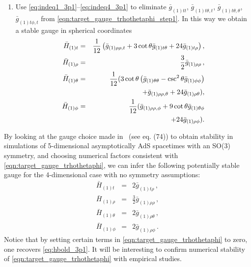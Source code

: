 \documentclass[aps,letterpaper,twocolumn,nofootinbib]{revtex4}
\numberwithin{equation}{section}
\begin{document}
\begin{enumerate}
\item Use \eqref{eq:indeq1_3p1}--\eqref{eq:indeq4_3p1} to eliminate $\bar{g}_{(1)tt}$, $\bar{g}_{(1)t\theta,t}$, $\bar{g}_{(1)t\theta,\theta}$, $\bar{g}_{(1)t\phi,t}$ from \eqref{eqn:target_gauge_trhothetaphi_step1}.
In this way we obtain a stable gauge in spherical coordinates
\begin{eqnarray}\label{eqn:target_gauge_trhothetaphi}
\bar{H}_{(1)t}&=&\frac{1}{12} \left(\bar{g}_{(1) \rho \rho ,t}+3 \cot \theta  \bar{g}_{(1) \text{$t$$\theta
   $}}+24 \bar{g}_{(1) \text{$t$$\rho $}}\right), \nonumber\\
\bar{H}_{(1)\rho}&=&\frac{3}{2} \bar{g}_{(1) \rho \rho }\,,\nonumber\\
\bar{H}_{(1)\theta}&=&\frac{1}{12} (3 \cot \theta  \left(\bar{g}_{(1)\theta\theta}-\csc ^2\theta \bar{g}_{(1) \phi \phi }\right)\nonumber \\
   &&\hspace{0.5cm}+\bar{g}_{(1) \rho \rho ,\theta }+24 \bar{g}_{(1) \rho \theta }),\nonumber\\
\bar{H}_{(1)\phi}&=&\frac{1}{12}(\bar{g}_{(1) \rho \rho ,\phi }+9 \cot \theta  \bar{g}_{(1)\theta \phi}\nonumber \\
   &&\hspace{0.5cm}+24 \bar{g}_{(1) \rho \phi }).
\end{eqnarray}
\end{enumerate}
By looking at the gauge choice made in~\cite{Bantilan:2012vu} (see eq. (74)) to obtain stability in simulations of 5-dimensional asymptotically AdS spacetimes with an SO(3) symmetry, and choosing numerical factors consistent with \eqref{eqn:target_gauge_trhothetaphi}, we can infer the following potentially stable gauge for the 4-dimensional case with no symmetry assumptions:
\begin{eqnarray}
\label{eq:hbold_3p1}
\bar{H}_{(1)t}&=&2 \bar{g}_{(1)\text{$t$$\rho $}}\,, \nonumber\\
\bar{H}_{(1)\rho}&=&\frac{3}{2} \bar{g}_{(1) \rho \rho }\,,\nonumber\\
\bar{H}_{(1)\theta}&=&2 \bar{g}_{(1) \rho \theta }\,,\nonumber\\
\bar{H}_{(1)\phi}&=&2 \bar{g}_{(1) \rho \phi }\,.
\end{eqnarray}
Notice that by setting certain terms in \eqref{eqn:target_gauge_trhothetaphi} to zero, one recovers \eqref{eq:hbold_3p1}.
It will be interesting to confirm numerical stability of \eqref{eqn:target_gauge_trhothetaphi} with empirical studies.
\end{document}
